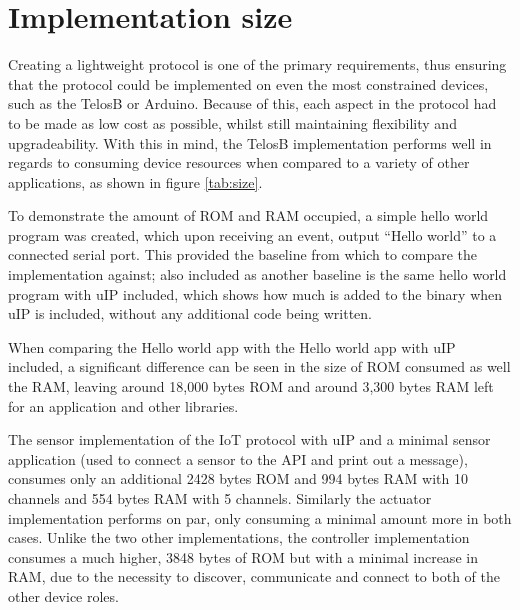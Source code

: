 
\section{Implementation size} %
\label{sec:implementation_size_and_performance}
Creating a lightweight protocol is one of the primary requirements, thus ensuring that the protocol could be implemented on even the most constrained devices, such as the TelosB or Arduino. Because of this, each aspect in the protocol had to be made as low cost as possible, whilst still maintaining flexibility and upgradeability. With this in mind, the TelosB implementation performs well in regards to consuming device resources when compared to a variety of other applications, as shown in figure \ref{tab:size}.

To demonstrate the amount of ROM and RAM occupied, a simple hello world program was created, which upon receiving an event, output ``Hello world'' to a connected serial port. This provided the baseline from which to compare the implementation against; also included as another baseline is the same hello world program with uIP included, which shows how much is added to the binary when uIP is included, without any additional code being written.

When comparing the Hello world app with the Hello world app with uIP included, a significant difference can be seen in the size of ROM consumed as well the RAM, leaving around 18,000 bytes ROM and around 3,300 bytes RAM left for an application and other libraries.

The sensor implementation of the IoT protocol with uIP and a minimal sensor application (used to connect a sensor to the API and print out a message), consumes only an additional 2428 bytes ROM and 994 bytes RAM with 10 channels and 554 bytes RAM with 5 channels.
Similarly the actuator implementation performs on par, only consuming a minimal amount more in both cases. Unlike the two other implementations, the controller implementation consumes a much higher, 3848 bytes of ROM but with a minimal increase in RAM, due to the necessity to discover, communicate and connect to both of the other device roles.

